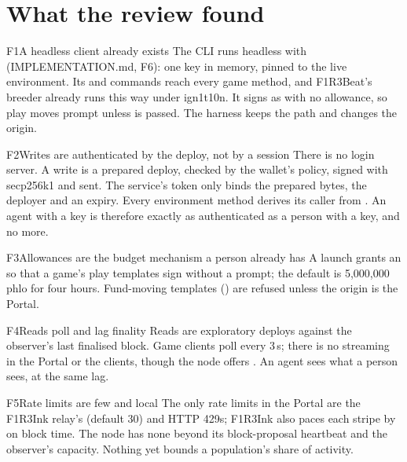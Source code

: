 \documentclass[11pt,a4paper]{article}
\begin{document}
\section{What the review found}\label{sec:findings}

\begin{finding}{F1}{A headless client already exists}
The CLI runs headless with  (IMPLEMENTATION.md, F6): one key in memory, pinned
to the live environment. Its  and  commands reach every game method, and
F1R3Beat's breeder already runs this way under ign1t10n. It signs as  with no
allowance, so play moves prompt unless  is passed. The harness keeps the path and changes
the origin.
\end{finding}

\begin{finding}{F2}{Writes are authenticated by the deploy, not by a session}
There is no login server. A write is a prepared deploy, checked by the wallet's policy, signed with
secp256k1 and sent. The service's token only binds the prepared bytes, the deployer and an expiry.
Every environment method derives its caller from . An agent with a key is
therefore exactly as authenticated as a person with a key, and no more.
\end{finding}

\begin{finding}{F3}{Allowances are the budget mechanism a person already has}
A launch grants an  so
that a game's play templates sign without a prompt; the default is 5,000,000 phlo for four hours.
Fund-moving templates () are refused unless the origin is the Portal.
\end{finding}

\begin{finding}{F4}{Reads poll and lag finality}
Reads are exploratory deploys against the observer's last finalised block. Game clients poll every
3\,s; there is no streaming in the Portal or the clients, though the node offers .
An agent sees what a person sees, at the same lag.
\end{finding}

\begin{finding}{F5}{Rate limits are few and local}
The only rate limits in the Portal are the F1R3Ink relay's  (default 30) and HTTP
429s; F1R3Ink also paces each stripe by  on block time. The node has none beyond
its block-proposal heartbeat and the observer's capacity. Nothing yet bounds a population's share of
activity.
\end{finding}
\end{document}
